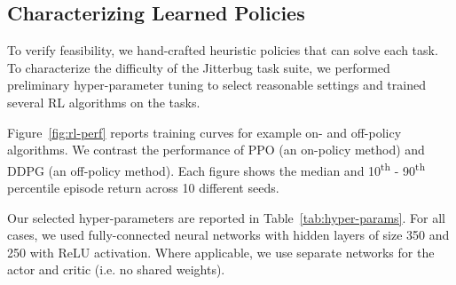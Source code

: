 \documentclass[letterpaper, 10 pt, conference]{ieeeconf}
\newcommand{\rowstyle}[1]{\gdef\currentrowstyle{#1}%
    #1\ignorespaces
}
\begin{document}
\begin{table}[t]
{
    }
    
\end{table}

\subsection{Characterizing Learned Policies}
To verify feasibility, we hand-crafted heuristic policies that can solve each task.
To characterize the difficulty of the Jitterbug task suite, we performed preliminary hyper-parameter tuning to select reasonable settings and trained several RL algorithms on the tasks.


Figure~\ref{fig:rl-perf} reports training curves for example on- and off-policy algorithms.
We contrast the performance of PPO (an on-policy method) and DDPG (an off-policy method).
Each figure shows the median and 10\textsuperscript{th} - 90\textsuperscript{th} percentile episode return across 10 different seeds.

Our selected hyper-parameters are reported in Table~\ref{tab:hyper-params}.
For all cases, we used fully-connected neural networks with hidden layers of size 350 and 250 with ReLU activation.
Where applicable, we use separate networks for the actor and critic (i.e. no shared weights).
\end{document}
